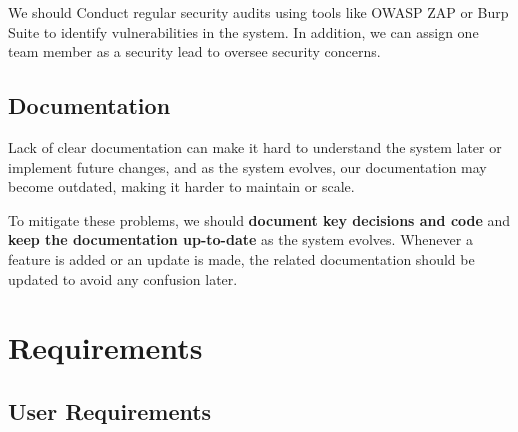 \documentclass[twoside,a4paper,journal]{IEEEtran}
\begin{document}
We should Conduct regular security audits using tools like OWASP ZAP or Burp
Suite to identify vulnerabilities in the system.
In addition, we can assign one team member as a security lead to oversee
security concerns.

\subsection{Documentation}
Lack of clear documentation can make it hard to understand the system later or
implement future changes, and as the system evolves, our documentation may
become outdated, making it harder to maintain or scale.

To mitigate these problems, we should
\textbf{document key decisions and code} and
\textbf{keep the documentation up-to-date} as the system evolves.
Whenever a feature is added or an update is made, the related documentation
should be updated to avoid any confusion later.

\section{Requirements}
\subsection{User Requirements}
\end{document}
